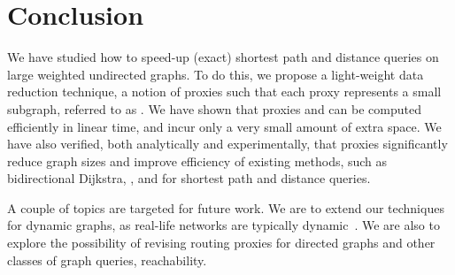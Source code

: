 \section{Conclusion}
\label{sec-con}

We have studied how to speed-up (exact)  shortest path and distance queries on large weighted undirected graphs.
To do this, we  propose  a light-weight data reduction technique, a notion of proxies such that each proxy represents a small subgraph, referred to as \dras. We have shown that
proxies and \dras can be computed efficiently in linear time, and incur only a very small amount of extra space.  We have also verified,
both analytically and experimentally, that proxies significantly reduce graph sizes and improve efficiency of existing methods, such as bidirectional Dijkstra, \arcflag, \tnr and \ah for shortest path and distance queries.

A couple of topics are targeted for future work.
%
We are to extend our techniques for dynamic graphs, as real-life networks are typically dynamic~\cite{fcs-biggraph}.
%
We are also to explore the possibility of revising routing proxies for directed graphs and other classes of graph queries, \eg reachability.
